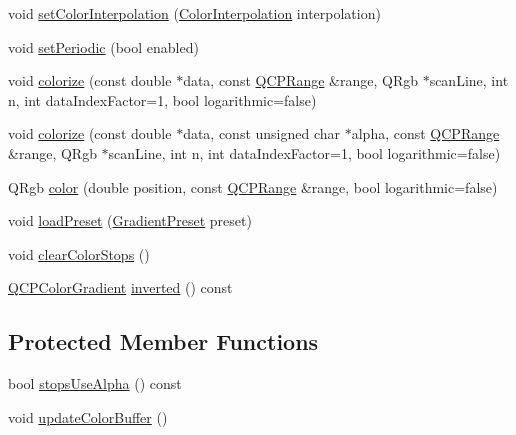 \begin{DoxyCompactItemize}
\item 
void \mbox{\hyperlink{class_q_c_p_color_gradient_aa13fda86406e1d896a465a409ae63b38}{set\+Color\+Interpolation}} (\mbox{\hyperlink{class_q_c_p_color_gradient_ac5dca17cc24336e6ca176610e7f77fc1}{Color\+Interpolation}} interpolation)
\item 
void \mbox{\hyperlink{class_q_c_p_color_gradient_a39d6448155fc00a219f239220d14bb39}{set\+Periodic}} (bool enabled)
\item 
void \mbox{\hyperlink{class_q_c_p_color_gradient_aaf423ceb943e177b0ed2c48c811d83dc}{colorize}} (const double $\ast$data, const \mbox{\hyperlink{class_q_c_p_range}{Q\+C\+P\+Range}} \&range, Q\+Rgb $\ast$scan\+Line, int n, int data\+Index\+Factor=1, bool logarithmic=false)
\item 
void \mbox{\hyperlink{class_q_c_p_color_gradient_acf0cc7fba83ef21f7b8d5d5258519db3}{colorize}} (const double $\ast$data, const unsigned char $\ast$alpha, const \mbox{\hyperlink{class_q_c_p_range}{Q\+C\+P\+Range}} \&range, Q\+Rgb $\ast$scan\+Line, int n, int data\+Index\+Factor=1, bool logarithmic=false)
\item 
Q\+Rgb \mbox{\hyperlink{class_q_c_p_color_gradient_a0599545c859268b025d2060dea741cea}{color}} (double position, const \mbox{\hyperlink{class_q_c_p_range}{Q\+C\+P\+Range}} \&range, bool logarithmic=false)
\item 
void \mbox{\hyperlink{class_q_c_p_color_gradient_aa0aeec1528241728b9671bf8e60b1622}{load\+Preset}} (\mbox{\hyperlink{class_q_c_p_color_gradient_aed6569828fee337023670272910c9072}{Gradient\+Preset}} preset)
\item 
void \mbox{\hyperlink{class_q_c_p_color_gradient_a939213e85f0d1279519d555c5fcfb6ad}{clear\+Color\+Stops}} ()
\item 
\mbox{\hyperlink{class_q_c_p_color_gradient}{Q\+C\+P\+Color\+Gradient}} \mbox{\hyperlink{class_q_c_p_color_gradient_a9f72f501de429829ec446333316decda}{inverted}} () const
\end{DoxyCompactItemize}
\subsection*{Protected Member Functions}
\begin{DoxyCompactItemize}
\item 
bool \mbox{\hyperlink{class_q_c_p_color_gradient_a137b368ea8829a871974add6e4883c71}{stops\+Use\+Alpha}} () const
\item 
void \mbox{\hyperlink{class_q_c_p_color_gradient_a353f15ab3ab586eebf1f6b58c3e2707b}{update\+Color\+Buffer}} ()
\end{DoxyCompactItemize}
